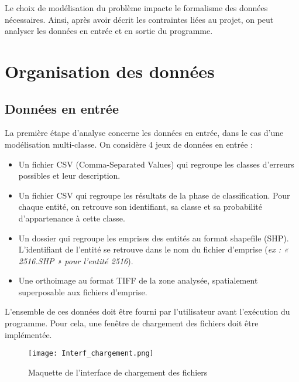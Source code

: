 Le choix de modélisation du problème impacte le formalisme des données nécessaires. Ainsi, après avoir décrit les contraintes liées au projet, on peut analyser les données en entrée et en sortie du programme.\newline

\section{Organisation des données}

\subsection{Données en entrée}

La première étape d'analyse concerne les données en entrée, dans le cas d'une modélisation multi-classe. On considère 4 jeux de données en entrée :
\begin{itemize}[label=$\rightarrow$]
	\item Un fichier CSV (Comma-Separated Values) qui regroupe les classes d’erreurs possibles et leur description.
	\item Un fichier CSV qui regroupe les résultats de la phase de classification. Pour chaque entité, on retrouve son identifiant, sa classe et sa probabilité d’appartenance à cette classe.
	\item Un dossier qui regroupe les emprises des entités au format shapefile (SHP). L’identifiant de l’entité se retrouve dans le nom du fichier d'emprise (\emph{ex : « 2516.SHP » pour l’entité 2516}).
	\item Une orthoimage au format TIFF de la zone analysée, spatialement superposable aux fichiers d’emprise.\newline
\end{itemize}

L’ensemble de ces données doit être fourni par l’utilisateur avant l’exécution du programme. Pour cela, une fenêtre de chargement des fichiers doit être implémentée. \newline

\begin{figure}[H]
	\begin{center}
		\texttt{[image: Interf\_chargement.png]}  \\
		\caption[Maquette de l'interface de chargement des fichiers]{Maquette de l'interface de chargement des fichiers}
		\label{fig:interfCharg}
	\end{center}
\end{figure}

